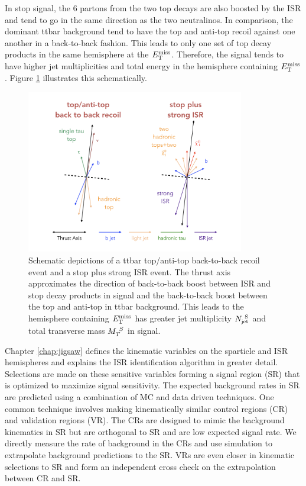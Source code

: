 \indent In stop signal, the 6 partons from the two top decays are also boosted by the ISR and tend to go in the same direction as the two neutralinos.  In comparison, the dominant ttbar background tend to have the top and anti-top recoil against one another in a back-to-back fashion.  This leads to only one set of top decay products in the same hemisphere at the $E_{\mathrm{T}}^{\mathrm{miss}}$.  Therefore, the signal tends to have higher jet multiplicities and total energy in the hemisphere containing $E_{\mathrm{T}}^{\mathrm{miss}}$.  Figure \ref{fig:ISR:ttbarb2b_sig} illustrates this schematically.  \\

\begin{figure}[h!]
  \centering
	\includegraphics[width=0.85\textwidth]{./figures/strategy/ttbarb2b_stop.png}
	\caption{Schematic depictions of a ttbar top/anti-top back-to-back recoil event and a stop plus strong ISR event.  The thrust axis approximates the direction of back-to-back boost between ISR and stop decay products in signal and the back-to-back boost between the top and anti-top in ttbar background.  This leads to the hemisphere containing $E_{\mathrm{T}}^{\mathrm{miss}}$ has greater jet multiplicity $N_{\mathrm{jet}}^{~\mathrm{S}}$ and total transverse mass $M_{T}^{~S}$ in signal. }
	\label{fig:ISR:ttbarb2b_sig}
\end{figure}

\indent Chapter \ref{chap:jigsaw} defines the kinematic variables on the sparticle and ISR hemispheres and explains the ISR identification algorithm in greater detail. \\

\indent Selections are made on these sensitive variables forming a signal region (SR) that is optimized to maximize signal sensitivity.  The expected background rates in SR are predicted using a combination of MC and data driven techniques.  One common technique involves making kinematically similar control regions (CR) and validation regions (VR). The CRs are designed to mimic the background kinematics in SR but are orthogonal to SR and are low expected signal rate.  We directly measure the rate of background in the CRs and use simulation to extrapolate background predictions to the SR.  VRs are even closer in kinematic selections to SR and form an independent cross check on the extrapolation between CR and SR. \\

